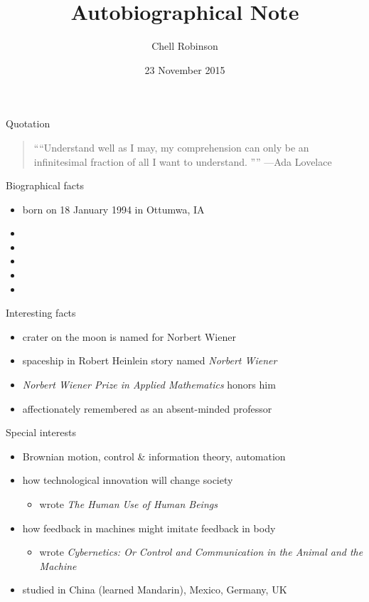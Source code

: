 \documentclass{beamer}
\title{Autobiographical Note}
\author{Chell Robinson}
\institute{Cornell College}
\date{23 November 2015}
\begin{document}
\begin{frame}
  \titlepage
\end{frame}

\begin{frame}{Quotation}
\begin{quotation}
\noindent
``“Understand well as I may, my comprehension can only be an infinitesimal fraction of all I want to understand. ”''
  \flushright
  ---Ada Lovelace
  \end{quotation}
\end{frame}

\begin{frame}{Biographical facts}
\begin{itemize}
  \item born on 18 January 1994 in Ottumwa, IA
  \item 
  \item 
  \item 
  \item 
  \item 
  \end{itemize}
\end{frame}

\begin{frame}{Interesting facts}
\begin{itemize}
  \item crater on the moon is named for Norbert Wiener
  \item spaceship in Robert Heinlein story
    named \emph{Norbert Wiener}
  \item \emph{Norbert Wiener Prize in Applied Mathematics} honors him
  \item affectionately remembered as an absent-minded professor
  \end{itemize}
\end{frame}

\begin{frame}{Special interests}
\begin{itemize}
  \item Brownian motion, control \& information theory,
    automation
  \item how technological innovation will
    change society 
  \begin{itemize}
    \item wrote \emph{The Human Use of Human Beings}
    \end{itemize}
  \item how feedback in machines might imitate feedback in body
  \begin{itemize}
    \item wrote \emph{Cybernetics: Or Control
      and Communication in the Animal and the Machine}
    \end{itemize}
  \item studied in China (learned Mandarin), Mexico, Germany, UK
  \end{itemize}
\end{frame}
\end{document}
